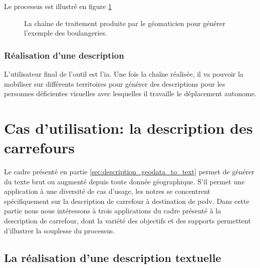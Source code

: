 Le processus est illustré en figure \ref{fig:desc_chaine_sig}

\begin{figure}
    \centering
    \caption{La chaîne de traitement produite par le géomaticien pour générer l'exemple des boulangeries.}
    \label{fig:desc_chaine_sig}
\end{figure}

\subsubsection{Réalisation d'une description}

L’utilisateur final de l’outil est l’\gls{ia}. Une fois la chaîne réalisée, il va pouvoir la mobiliser sur différents territoires pour générer des descriptions pour les personnes déficientes visuelles avec lesquelles il travaille le déplacement autonome.

\section{Cas d'utilisation: la description des carrefours}

Le cadre présenté en partie \ref{sec:description_geodata_to_text} permet de générer du texte brut ou augmenté depuis toute donnée géographique. S'il permet une application à une diversité de cas d'usage, les notres se concentrent spécifiquement sur la description de carrefour à destination de \gls{pcdv}. Dans cette partie nous nous intéressons à trois applications du cadre présenté à la description de carrefour, dont la variété des objectifs et des supports permettent d'illustrer la souplesse du processus.

\subsection{La réalisation d'une description textuelle}

